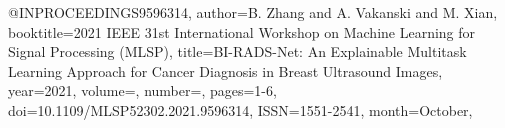 @INPROCEEDINGS{9596314,
  author={B. {Zhang} and A. {Vakanski} and M. {Xian}},
  booktitle={2021 IEEE 31st International Workshop on Machine Learning for Signal Processing (MLSP)}, 
  title={BI-RADS-Net: An Explainable Multitask Learning Approach for Cancer Diagnosis in Breast Ultrasound Images}, 
  year={2021},
  volume={},
  number={},
  pages={1-6},
  doi={10.1109/MLSP52302.2021.9596314},
  ISSN={1551-2541},
  month={October},}
